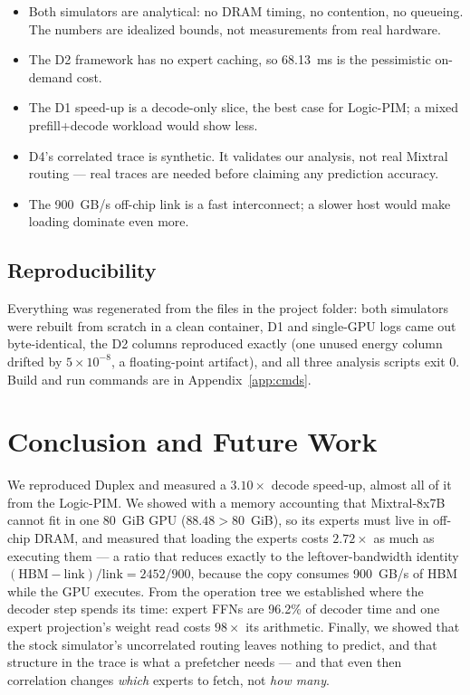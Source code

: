 \documentclass[11pt,a4paper]{report}
\begin{document}
\begin{itemize}
\item Both simulators are analytical: no DRAM timing, no contention, no queueing. The numbers are idealized bounds, not measurements from real hardware.
\item The D2 framework has no expert caching, so 68.13~ms is the pessimistic on-demand cost.
\item The D1 speed-up is a decode-only slice, the best case for Logic-PIM; a mixed prefill+decode workload would show less.
\item D4's correlated trace is synthetic. It validates our analysis, not real Mixtral routing --- real traces are needed before claiming any prediction accuracy.
\item The 900~GB/s off-chip link is a fast interconnect; a slower host would make loading dominate even more.
\end{itemize}

\section{Reproducibility}

Everything was regenerated from the files in the project folder: both simulators were rebuilt from scratch in a clean container, D1 and single-GPU logs came out byte-identical, the D2 columns reproduced exactly (one unused energy column drifted by $5\times10^{-8}$, a floating-point artifact), and all three analysis scripts exit 0. Build and run commands are in Appendix~\ref{app:cmds}.

\chapter{Conclusion and Future Work}
\label{ch:conc}

We reproduced Duplex and measured a $3.10\times$ decode speed-up, almost all of it from the Logic-PIM. We showed with a memory accounting that Mixtral-8x7B cannot fit in one 80~GiB GPU ($88.48 > 80$~GiB), so its experts must live in off-chip DRAM, and measured that loading the experts costs $2.72\times$ as much as executing them --- a ratio that reduces exactly to the leftover-bandwidth identity $(\text{HBM} - \text{link})/\text{link} = 2452/900$, because the copy consumes 900~GB/s of HBM while the GPU executes. From the operation tree we established where the decoder step spends its time: expert FFNs are 96.2\% of decoder time and one expert projection's weight read costs $98\times$ its arithmetic. Finally, we showed that the stock simulator's uncorrelated routing leaves nothing to predict, and that structure in the trace is what a prefetcher needs --- and that even then correlation changes \textit{which} experts to fetch, not \textit{how many}.
\end{document}
